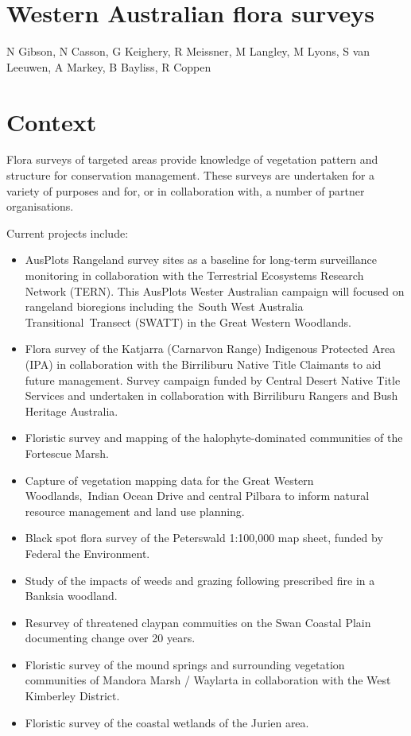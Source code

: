\documentclass[version=last,
    paper=a4, %
    10pt, %
    usenames,
    dvipsnames,
    oneside, %
    headings=openany, %
    DIV=15 %
]{scrbook}
\begin{document}
\section*{Western Australian flora surveys
}

N Gibson, N Casson, G Keighery, R Meissner, M Langley, M Lyons, S van
Leeuwen, A Markey, B Bayliss, R Coppen


\section*{Context}
Flora surveys of targeted areas provide knowledge of vegetation pattern
and structure for conservation management. These surveys are undertaken
for a variety of purposes and for, or in collaboration with, a number of
partner organisations.

Current projects include:

\begin{itemize}
\itemsep1pt\parskip0pt
\item
  AusPlots Rangeland survey sites as a baseline for long-term
  surveillance monitoring in collaboration with the Terrestrial
  Ecosystems Research Network (TERN). This AusPlots Wester Australian
  campaign will focused on rangeland bioregions including the~South West
  Australia Transitional~Transect (SWATT) in the Great Western
  Woodlands.
\item
  Flora survey of the Katjarra (Carnarvon Range) Indigenous Protected
  Area (IPA) in collaboration with the Birriliburu Native Title
  Claimants to aid future management. Survey campaign funded by Central
  Desert Native Title Services and undertaken in collaboration with
  Birriliburu Rangers and Bush Heritage Australia.
\item
  Floristic survey and mapping of the halophyte-dominated communities of
  the Fortescue Marsh.
\item
  Capture of vegetation mapping data for the Great Western
  Woodlands,~Indian Ocean Drive and central Pilbara to inform natural
  resource management and land use planning.
\item
  Black spot flora survey of the Peterswald 1:100,000 map sheet, funded
  by Federal the Environment.
\item
  Study of the impacts of weeds and grazing following prescribed fire in
  a Banksia woodland.
\item
  Resurvey of threatened claypan commuities on the Swan Coastal Plain
  documenting change over 20 years.
\item
  Floristic survey of the mound springs and surrounding vegetation
  communities of Mandora Marsh / Waylarta in collaboration with the West
  Kimberley District.
\item
  Floristic survey of the coastal wetlands of the Jurien area.
\end{itemize}
\end{document}
